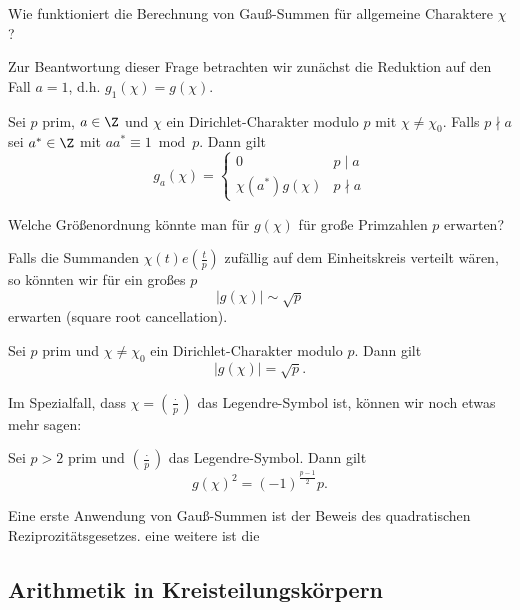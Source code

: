\begin{frage*}
	Wie funktioniert die Berechnung von Gauß-Summen für allgemeine Charaktere $\chi$?
\end{frage*}

Zur Beantwortung dieser Frage betrachten wir zunächst die Reduktion auf den Fall $a=1$, d.h. $g_1(\chi) = g(\chi)$.

\begin{lem}\autolabel
	Sei $p$ prim, $a \in \Z$ und $\chi$ ein Dirichlet-Charakter modulo $p$ mit $\chi \neq \chi_0$. Falls $p \nmid a$ sei $a^* \in \Z$ mit $aa^* \equiv 1 \bmod p$. Dann gilt
	\[ g_a(\chi) = \begin{cases}
		0 &p \mid a\\
		\chi(a^*)g(\chi) &p \nmid a
	\end{cases} \]
\end{lem}

\begin{frage*}
	Welche Größenordnung könnte man für $g(\chi)$ für große Primzahlen $p$ erwarten?
\end{frage*}

\begin{idee*}
	Falls die Summanden $\chi(t) e\left( \frac{t}{p} \right)$ zufällig auf dem Einheitskreis verteilt wären, so könnten wir für ein großes $p$
	\[ |g(\chi)| \sim \sqrt{p} \]
	erwarten (square root cancellation).
\end{idee*}

\begin{thm}\autolabel
	Sei $p$ prim und $\chi \neq \chi_0$ ein Dirichlet-Charakter modulo $p$. Dann gilt
	\[ |g(\chi)| = \sqrt{p}. \]
\end{thm}

Im Spezialfall, dass $\chi = \left(\frac{\cdot}{p}\right)$ das Legendre-Symbol ist, können wir noch etwas mehr sagen:

\begin{thm}\autolabel
	Sei $p>2$ prim und $\left(\frac{\cdot}{p}\right)$ das Legendre-Symbol. Dann gilt
	\[ g(\chi)^2 = (-1)^{\frac{p-1}{2}}p. \]
\end{thm}

Eine erste Anwendung von Gauß-Summen ist der Beweis des quadratischen Reziprozitätsgesetzes. eine weitere ist die

\subsection{Arithmetik in Kreisteilungskörpern}

